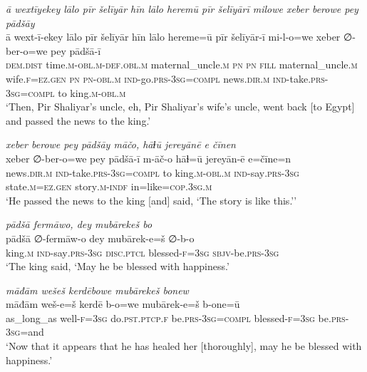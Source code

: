 \ea \label{ŽP.258}
\textit{ā wextīyekey lālo pīr šelīyār hīn lālo heremū pīr šelīyārī milowe xeber berowe pey pādšāy} \\ 
\gll ā wext-ī-ekey lālo pīr šelīyār hīn lālo hereme=ū pīr šelīyār-ī mi-l-o=we xeber ∅-ber-o=we pey pādšā-ī \\ 
 \textsc{dem.dist} time\textsc{.m}\textsc{-obl}\textsc{.m}\textsc{-def}\textsc{.obl}\textsc{.m} maternal\_uncle\textsc{.m} \textsc{pn} \textsc{pn} \textsc{fill} maternal\_uncle\textsc{.m} wife\textsc{.f}\textsc{\textsc{=ez.gen}} \textsc{pn} \textsc{pn}\textsc{-obl}\textsc{.m} \textsc{ind-}go\textsc{.prs}\textsc{-3sg}\textsc{=compl} news\textsc{.dir}\textsc{.m} \textsc{ind-}take\textsc{.prs}\textsc{-3sg}\textsc{=compl} to king\textsc{.m}\textsc{-obl}\textsc{.m} \\ 
\glt `Then, Pir Shaliyar’s uncle, eh, Pir Shaliyar’s wife’s uncle, went back [to Egypt] and passed the news to the king.'
\z 
 
\ea \label{ŽP.259}
\textit{xeber berowe pey pādšāy māčo, hāɫū jereyānē e čīnen} \\ 
\gll xeber ∅-ber-o=we pey pādšā-ī m-āč-o hāɫ=ū jereyān-ē e=čīne=n \\ 
 news\textsc{.dir}\textsc{.m} \textsc{ind-}take\textsc{.prs}\textsc{-3sg}\textsc{=compl} to king\textsc{.m}\textsc{-obl}\textsc{.m} \textsc{ind-}say\textsc{.prs}\textsc{-3sg} state\textsc{.m}\textsc{\textsc{=ez.gen}} story\textsc{.m}\textsc{-indf} in=like\textsc{=cop}\textsc{.3sg}\textsc{.m} \\ 
\glt `He passed the news to the king [and] said, ‘The story is like this.’'
\z 
 
\ea \label{ŽP.260}
\textit{pādšā fermāwo, dey mubārekeš bo} \\ 
\gll pādšā ∅-fermāw-o dey mubārek-e=š ∅-b-o \\ 
 king\textsc{.m} \textsc{ind-}say\textsc{.prs}\textsc{-3sg} \textsc{disc.ptcl} blessed\textsc{-f}\textsc{=3sg} \textsc{sbjv-}be\textsc{.prs}\textsc{-3sg} \\ 
\glt `The king said, ‘May he be blessed with happiness.'
\z 
 
\ea \label{ŽP.261}
\textit{māđām wešeš kerdēbowe mubārekeš bonew} \\ 
\gll māđām weš-e=š kerdē b-o=we mubārek-e=š b-one=ū \\ 
 as\_long\_as well\textsc{-f}\textsc{=3sg} do\textsc{.pst}\textsc{.ptcp}\textsc{.f} be\textsc{.prs}\textsc{-3sg}\textsc{=compl} blessed\textsc{-f}\textsc{=3sg} be\textsc{.prs}\textsc{-3sg}=and \\ 
\glt `Now that it appears that he has healed her [thoroughly], may he be blessed with happiness.'
\z 
 
